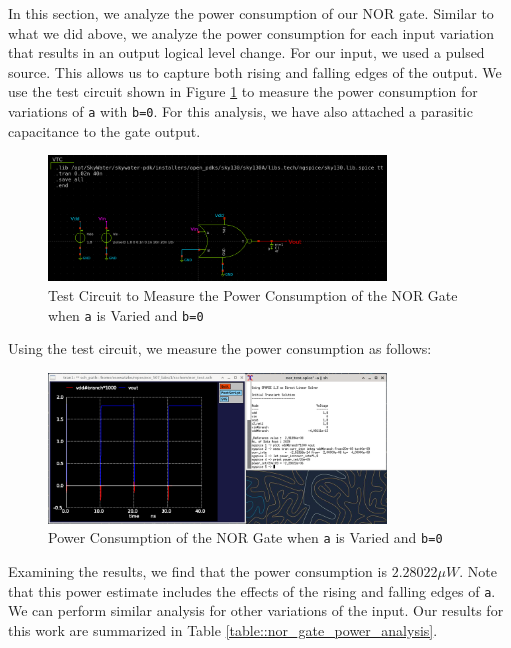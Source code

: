 \documentclass[fleqn]{article}
\begin{document}
	In this section, we analyze the power consumption of our NOR gate. Similar to what we did above, we analyze the power consumption for each input variation that results in an output logical level change. For our input, we used a pulsed source. This allows us to capture both rising and falling edges of the output. We use the test circuit shown in Figure \ref{fig::nor_power_test_sweep_va} to measure the power consumption for variations of \texttt{a} with \texttt{b=0}. For this analysis, we have also attached a parasitic capacitance to the gate output.
	
	\begin{figure}[H]
		\centerline{\includegraphics[width=0.8\textwidth]{nor_power_test_sweep_va.png}}
		\caption{Test Circuit to Measure the Power Consumption of the NOR Gate when \texttt{a} is Varied and \texttt{b=0}}
		\label{fig::nor_power_test_sweep_va}
	\end{figure}
	
	\noindent Using the test circuit, we measure the power consumption as follows:
	
	\begin{figure}[H]
		\centerline{\includegraphics[width=0.8\textwidth]{nor_power_sweep_va.png}}
		\caption{Power Consumption of the NOR Gate when \texttt{a} is Varied and \texttt{b=0}}
		\label{fig::nor_power_sweep_va}
	\end{figure}
	
	\noindent Examining the results, we find that the power consumption is $2.28022{\mu}W$. Note that this power estimate includes the effects of the rising and falling edges of \texttt{a}. We can perform similar analysis for other variations of the input. Our results for this work are summarized in Table \ref{table::nor_gate_power_analysis}.
	
\end{document}

